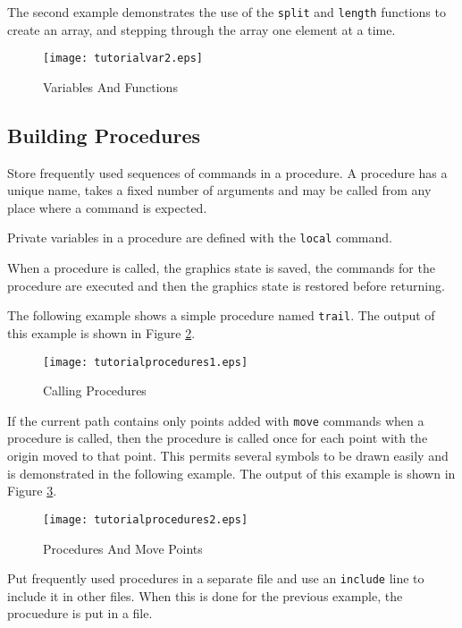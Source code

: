 The second example demonstrates the use of the
\texttt{split} and \texttt{length}
functions
to create an array, and stepping through the array one
element at a time.



\begin{figure}[h]
\texttt{[image: tutorialvar2.eps]}
\caption{Variables And Functions}
\label{tutorialvar2}
\end{figure}


\subsection{Building Procedures}

Store frequently used sequences of commands in a procedure.
A procedure has a unique name, takes a fixed number of arguments and
may be called from any place where a command is expected.

Private variables in a procedure are defined with the 
\texttt{local} command.

When a procedure is called, the graphics state
is saved, the commands for the procedure are executed and then the
graphics state is restored before returning.

The following example shows a simple procedure named \texttt{trail}.
The output of this example is shown in Figure \ref{tutorialprocedures1}.



\begin{figure}[h]
\texttt{[image: tutorialprocedures1.eps]}
\caption{Calling Procedures}
\label{tutorialprocedures1}
\end{figure}

If the current path contains only points added with \texttt{move}
commands when a procedure is called, then the
procedure is called once for each point with the origin
moved to that point.  This permits several symbols to be drawn
easily and is demonstrated in the following example.  The 
output of this example is shown in Figure \ref{tutorialprocedures2}.



\begin{figure}[h]
\texttt{[image: tutorialprocedures2.eps]}
\caption{Procedures And Move Points}
\label{tutorialprocedures2}
\end{figure}


Put frequently used procedures in a separate file and use an
\texttt{include}
line to include it in other files.  When this is done for the
previous example, the procuedure is put in a file.

